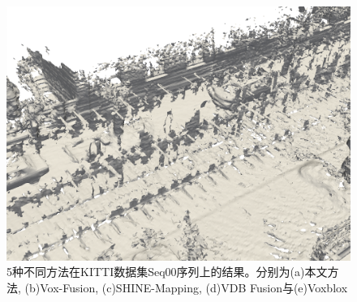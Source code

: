 \begin{figure}[htbp]
\begin{minipage}{0.322\linewidth}
        \includegraphics[width=1\linewidth]{figures/kitti_3_voxblox.png}
        \end{minipage}
    \caption{5种不同方法在KITTI数据集Seq00序列上的结果。分别为(a)本文方法, (b)Vox-Fusion, (c)SHINE-Mapping, (d)VDB Fusion与(e)Voxblox}\label{kittiresult}
\end{figure}

